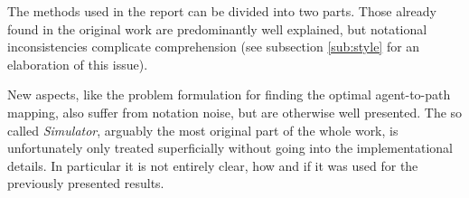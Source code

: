 \documentclass[../review.tex]{subfiles}
\begin{document}
The methods used in the report can be divided into two parts. Those already found in the original work are predominantly well explained, but notational inconsistencies complicate comprehension (see subsection \ref{sub:style} for an elaboration of this issue).

New aspects, like the problem formulation for finding the optimal agent-to-path mapping, also suffer from notation noise, but are otherwise well presented. The so called \textit{Simulator}, arguably the most original part of the whole work, is unfortunately only treated superficially without going into the implementational details. In particular it is not entirely clear, how and if it was used for the previously presented results.
\end{document}
